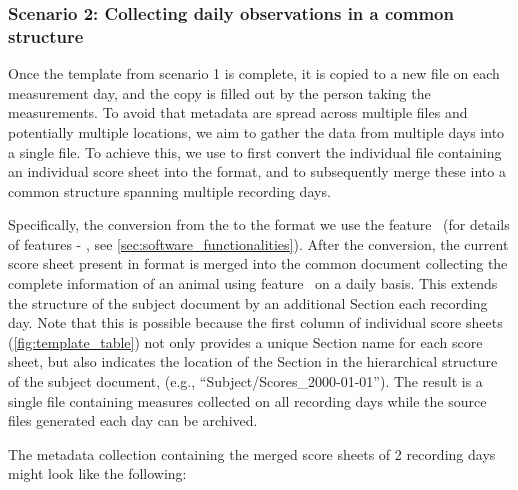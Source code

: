 \subsubsection*{Scenario 2: Collecting daily observations in a common  structure}

Once the template from scenario 1 is complete, it is copied to a new file on each measurement day, and the copy is filled out by the person taking the measurements. To avoid that metadata are spread across multiple files and potentially multiple locations, we aim to gather the data from multiple days into a single  file. To achieve this, we use  to first convert the individual  file containing an individual score sheet into the  format, and to subsequently merge these into a common  structure spanning multiple recording days.

Specifically, the conversion from the  to the  format we use the  feature \fconvert\ (for details of  features \fconvert - \ffilter, see \cref{sec:software_functionalities}). After the conversion, the current score sheet present in  format is merged into the common  document collecting the complete information of an animal using feature \fmerge \ on a daily basis. This extends the  structure of the subject document by an additional Section each recording day. Note that this is possible because the first column of individual score sheets (\cref{fig:template_table}) not only provides a unique Section name for each score sheet, but also indicates the location of the  Section in the hierarchical structure of the subject document, (e.g., ``Subject/Scores\_2000-01-01''). The result is a single  file containing measures collected on all recording days while the source files generated each day can be archived.

The metadata collection containing the merged score sheets of 2 recording days might look like the following:

\begin{minipage}[t]{\textwidth}
\ \\
\end{minipage}

